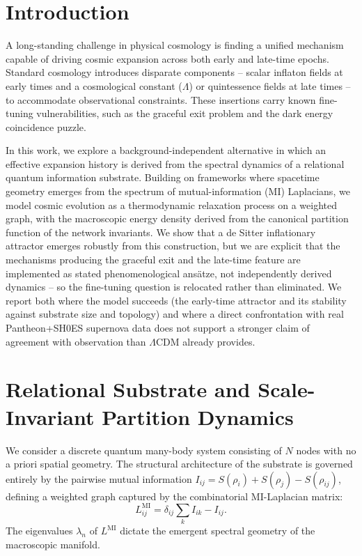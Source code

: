 \documentclass[onecolumn,PRD,amsmath,amssymb,aps,nofootinbib,superscriptaddress,11pt]{revtex4-2}
\begin{document}
\maketitle
{}

\section{Introduction}
A long-standing challenge in physical cosmology is finding a unified mechanism capable of driving cosmic expansion across both early and late-time epochs. Standard cosmology introduces disparate components -- scalar inflaton fields at early times and a cosmological constant ($\Lambda$) or quintessence fields at late times -- to accommodate observational constraints. These insertions carry known fine-tuning vulnerabilities, such as the graceful exit problem and the dark energy coincidence puzzle.

In this work, we explore a background-independent alternative in which an effective expansion history is derived from the spectral dynamics of a relational quantum information substrate. Building on frameworks where spacetime geometry emerges from the spectrum of mutual-information (MI) Laplacians, we model cosmic evolution as a thermodynamic relaxation process on a weighted graph, with the macroscopic energy density derived from the canonical partition function of the network invariants. We show that a de Sitter inflationary attractor emerges robustly from this construction, but we are explicit that the mechanisms producing the graceful exit and the late-time feature are implemented as stated phenomenological ansätze, not independently derived dynamics -- so the fine-tuning question is relocated rather than eliminated. We report both where the model succeeds (the early-time attractor and its stability against substrate size and topology) and where a direct confrontation with real Pantheon+SH0ES supernova data does not support a stronger claim of agreement with observation than $\Lambda$CDM already provides.

\section{Relational Substrate and Scale-Invariant Partition Dynamics}
We consider a discrete quantum many-body system consisting of $N$ nodes with no a priori spatial geometry. The structural architecture of the substrate is governed entirely by the pairwise mutual information $I_{ij} = S(\rho_i) + S(\rho_j) - S(\rho_{ij})$, defining a weighted graph captured by the combinatorial MI-Laplacian matrix:
\begin{equation}
L^{\text{MI}}_{ij} = \delta_{ij} \sum_{k} I_{ik} - I_{ij}.
\label{eq:laplacian}
\end{equation}
The eigenvalues $\lambda_n$ of $L^{\text{MI}}$ dictate the emergent spectral geometry of the macroscopic manifold.
\end{document}
